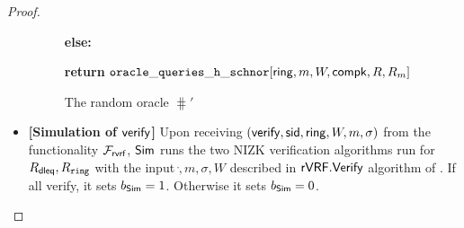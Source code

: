 \begin{proof}
\begin{itemize}
\begin{figure}
{{					
					
					
					
					
					\textbf{else:}
					
					
					
					{\textbf{return} $ \mathtt{oracle\_queries\_h\_schnor}[\mathsf{ring}, m,W,\mathsf{compk},R,R_m] $}
					
			}}
			\caption{The random oracle $ \hash' $}
			\label{oracle:H'}
		\end{figure}
		
		
		
		\item \textbf{[Simulation of $ \mathsf{verify} $]} Upon receiving  $(\mathsf{verify}, \textsf{sid}, \mathsf{ring},W, m, \sigma)$ from the functionality $\mathcal{F}_{\textsf{rvrf}}$, $ \mathsf{Sim} $ runs the two NIZK verification algorithms run for $ R_{\mathsf{dleq}}, R_{\mathtt{ring}} $ with the input $ \ring, m, \sigma, W $ described in $ {\mathsf{rVRF}}.{\mathsf{Verify}} $ algorithm of \name. If  all verify, it sets $ b_{\mathsf{Sim}} =1 $. Otherwise it sets $ b_{\mathsf{Sim}} =0  $.
		

\end{itemize}
\end{proof}
